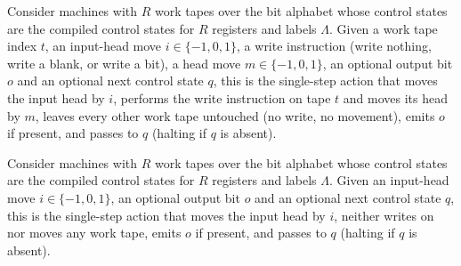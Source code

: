 \begin{definition}
\label{Complexity.CounterProg.act}
\leanok
{}
Consider machines with $R$ work tapes over the bit alphabet whose control states are the compiled
control states for $R$ registers and labels $\Lambda$. Given a work tape index $t$, an input-head
move $i \in \{-1, 0, 1\}$, a write instruction (write nothing, write a blank, or write a bit), a
head move $m \in \{-1, 0, 1\}$, an optional output bit $o$ and an optional next control state
$q$, this is the single-step action that moves the input head by $i$, performs the write
instruction on tape $t$ and moves its head by $m$, leaves every other work tape untouched (no
write, no movement), emits $o$ if present, and passes to $q$ (halting if $q$ is absent).
\end{definition}

\begin{definition}
\label{Complexity.CounterProg.ctl}
\leanok
{}
Consider machines with $R$ work tapes over the bit alphabet whose control states are the compiled
control states for $R$ registers and labels $\Lambda$. Given an input-head move
$i \in \{-1, 0, 1\}$, an optional output bit $o$ and an optional next control state $q$, this is
the single-step action that moves the input head by $i$, neither writes on nor moves any work
tape, emits $o$ if present, and passes to $q$ (halting if $q$ is absent).
\end{definition}


